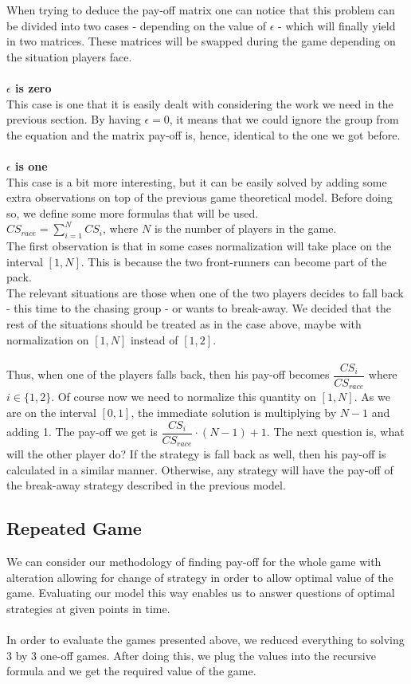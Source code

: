 \documentclass[10pt, a4paper]{report}
\begin{document}
When trying to deduce the pay-off matrix one can notice that this problem can be divided into two cases - depending on the value of $\epsilon$ - which will finally yield in two matrices. These matrices will be swapped during the game depending on the situation players face.
\\\\
\textbf{$\epsilon$ is zero}
\\
This case is one that it is easily dealt with considering the work we need in the previous section. By having $\epsilon = 0$, it means that we could ignore the group from the equation and the matrix pay-off is, hence, identical to the one we got before.
\\\\
\textbf{$\epsilon$ is one}
\\
This case is a bit more interesting, but it can be easily solved by adding some extra observations on top of the previous game theoretical model. Before doing so, we define some more formulas that will be used.\\
$CS_{race} = \sum\limits_{i=1}^{N} CS_i$, where $N$ is the number of players in the game. \\
The first observation is that in some cases normalization will take place on the interval $[1,N]$. This is because the two front-runners can become part of the pack.\\
The relevant situations are those when one of the two players decides to fall back - this time to the chasing group - or wants to break-away. We decided that the rest of the situations should be treated as in the case above, maybe with normalization on $[1,N]$ instead of $[1,2]$.\\\\
Thus, when one of the players falls back, then his pay-off becomes $\dfrac{CS_i}{CS_{race}}$ where $i\in\{1,2\}$. Of course now we need to normalize this quantity on $[1,N]$. As we are on the interval $[0,1]$, the immediate solution is multiplying by $N-1$ and adding 1. The pay-off we get is $ \dfrac{CS_i}{CS_{race}}\cdot (N-1) + 1$. The next question is, what will the other player do? If the strategy is fall back as well, then his pay-off is calculated in a similar manner. Otherwise, any strategy will have the pay-off of the break-away strategy described in the previous model.

\subsection{Repeated Game}
We can consider our methodology of finding pay-off for the whole game with alteration allowing for change of strategy in order to allow optimal value of the game. Evaluating our model this way enables us to answer questions of optimal strategies at given points in time.\\\\
In order to evaluate the games presented above, we reduced everything to solving 3 by 3 one-off games. After doing this, we plug the values into the recursive formula and we get the required value of the game. 
\end{document}
